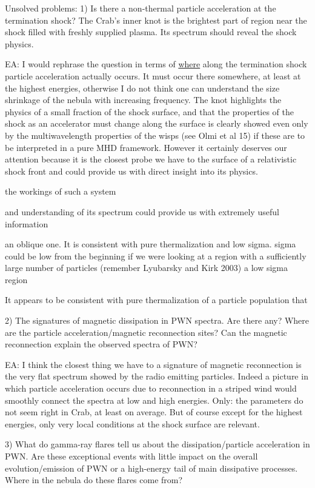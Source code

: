 Unsolved problems:
1) Is there a non-thermal particle acceleration at the termination shock? The Crab's inner knot is the brightest part of region near the shock filled with freshly supplied plasma. Its spectrum should reveal the shock physics. 

EA: I would rephrase the question in terms of \underline{where} along the termination shock particle acceleration actually occurs. It must occur there somewhere, at least at the highest energies, otherwise I do not think one can understand the size shrinkage of the nebula with increasing frequency. 
The knot highlights the physics of a small fraction of the shock surface, and that the properties of the shock as an accelerator must change along the surface is clearly showed even only by the multiwavelength properties of the wisps (see Olmi et al 15) if these are to be interpreted in a pure MHD framework. However it certainly deserves our attention because it is the closest probe we have to the surface of a relativistic shock front and could provide us with direct insight into its physics. 

the workings of such a system 

and understanding of its spectrum could provide us with extremely useful information

an oblique one. It is consistent with pure thermalization and low sigma. sigma could be low from the beginning if we were looking at a region with a sufficiently large number of particles (remember Lyubarsky and Kirk 2003) a low sigma region

It appears to be consistent with pure thermalization of a particle population that  

2) The signatures of magnetic dissipation in PWN spectra. Are there any?  Where are the particle acceleration/magnetic reconnection sites? Can the magnetic reconnection explain the observed spectra of PWN? 

EA: I think the closest thing we have to a signature of magnetic reconnection is the very flat spectrum showed by the radio emitting particles. Indeed a picture in which particle acceleration occurs due to reconnection in a striped wind would smoothly connect the spectra at low and high energies. Only: the parameters do not seem right in Crab, at least on average. But of course except for the highest energies, only very local conditions at the shock surface are relevant.

3) What do gamma-ray flares tell us about the dissipation/particle acceleration in PWN. 
Are these exceptional events with little impact on the overall evolution/emission of PWN or a high-energy tail of main dissipative processes. Where in the nebula do these flares come from? 


